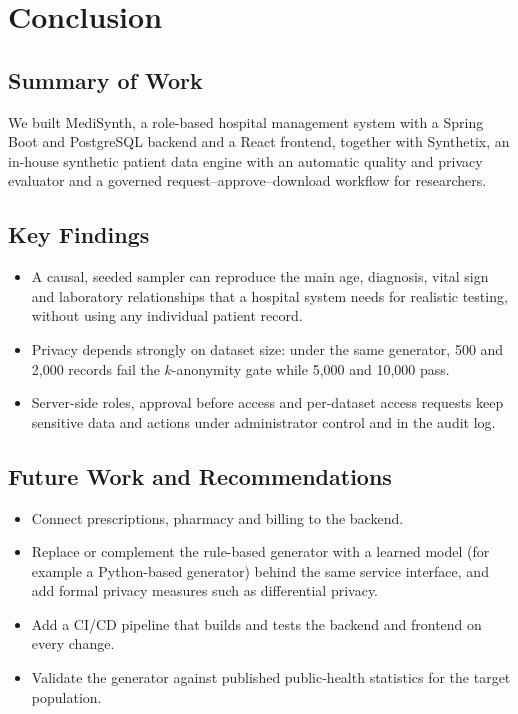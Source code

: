 \documentclass{tietreport}
\begin{document}

\chapter{Conclusion}

\section{Summary of Work}

We built MediSynth, a role-based hospital management system with a
Spring Boot and PostgreSQL backend and a React frontend, together with
Synthetix, an in-house synthetic patient data engine with an automatic quality
and privacy evaluator and a governed request--approve--download workflow for
researchers.

\section{Key Findings}

\begin{itemize}
  \item A causal, seeded sampler can reproduce the main age, diagnosis, vital
    sign and laboratory relationships that a hospital system needs for
    realistic testing, without using any individual patient record.
  \item Privacy depends strongly on dataset size: under the same generator,
    500 and 2,000 records fail the $k$-anonymity gate while 5,000 and 10,000
    pass.
  \item Server-side roles, approval before access and per-dataset access
    requests keep sensitive data and actions under administrator control and
    in the audit log.
\end{itemize}

\section{Future Work and Recommendations}

\begin{itemize}
  \item Connect prescriptions, pharmacy and billing to the backend.
  \item Replace or complement the rule-based generator with a learned model
    (for example a Python-based generator) behind the same service interface,
    and add formal privacy measures such as differential privacy.
  \item Add a CI/CD pipeline that builds and tests the backend and frontend
    on every change.
  \item Validate the generator against published public-health statistics for
    the target population.
\end{itemize}
\end{document}
